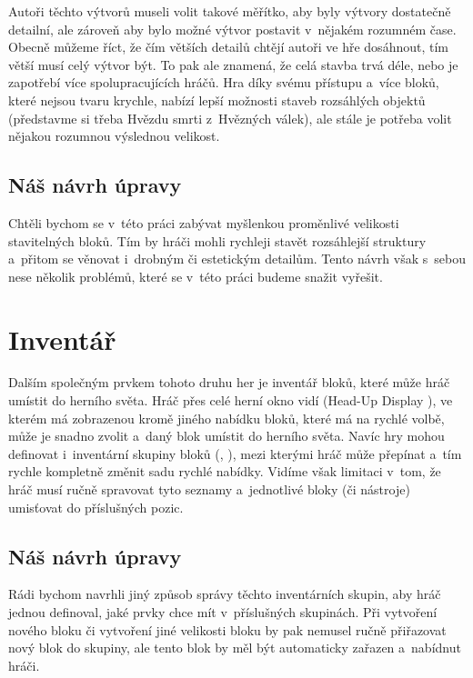 Autoři těchto výtvorů museli volit takové měřítko, aby byly výtvory dostatečně detailní, ale zároveň aby bylo možné výtvor postavit v~nějakém rozumném čase. Obecně můžeme říct, že čím větších detailů chtějí autoři ve hře \MC{} dosáhnout, tím větší musí celý výtvor být. To pak ale znamená, že celá stavba trvá déle, nebo je zapotřebí více spolupracujících hráčů. Hra \SE{} díky svému přístupu a~více bloků, které nejsou tvaru krychle, nabízí lepší možnosti staveb rozsáhlých objektů (představme si třeba Hvězdu smrti z~Hvězných válek), ale stále je potřeba volit nějakou rozumnou výslednou velikost.


\subsection{Náš návrh úpravy}
Chtěli bychom se v~této práci zabývat myšlenkou proměnlivé velikosti stavitelných bloků. Tím by hráči mohli rychleji stavět rozsáhlejší struktury a~přitom se věnovat i~drobným či estetickým detailům. Tento návrh však s~sebou nese několik problémů, které se v~této práci budeme snažit vyřešit.


\section{Inventář}
Dalším společným prvkem tohoto druhu her je inventář bloků, které může hráč umístit do herního světa. Hráč přes celé herní okno vidí \HUD{} (Head-Up Display \citep{hud_terminology}), ve kterém má zobrazenou kromě jiného nabídku bloků, které má na rychlé volbě, může je snadno zvolit a~daný blok umístit do herního světa. Navíc hry mohou definovat i~inventární skupiny bloků (\SE{}, \ME{}), mezi kterými hráč může přepínat a~tím rychle kompletně změnit sadu rychlé nabídky. Vidíme však limitaci v~tom, že hráč musí ručně spravovat tyto seznamy a~jednotlivé bloky (či nástroje) umisťovat do příslušných pozic.


\subsection{Náš návrh úpravy}
Rádi bychom navrhli jiný způsob správy těchto inventárních skupin, aby hráč jednou definoval, jaké prvky chce mít v~příslušných skupinách. Při vytvoření nového bloku či vytvoření jiné velikosti bloku by pak nemusel ručně přiřazovat nový blok do skupiny, ale tento blok by měl být automaticky zařazen a~nabídnut hráči.  




